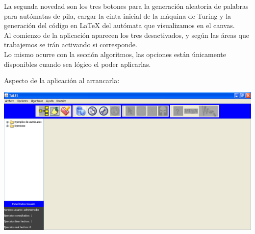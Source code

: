 \documentclass[12pt,a4paper,spanish]{book}
\begin{document}
La segunda novedad son los tres botones para la generaci\'on aleatoria de palabras para aut\'omatas de pila, cargar la cinta inicial de la m\'aquina de Turing y la generaci\'on del c\'odigo en \LaTeX{} del aut\'omata que visualizamos en el canvas.\\
\newline
Al comienzo de la aplicaci\'on aparecen los tres desactivados, y seg\'un las \'areas que trabajemos se ir\'an activando si corresponde.\\ Lo mismo ocurre con la secci\'on algoritmos, las opciones est\'an \'unicamente disponibles cuando sea l\'ogico el poder aplicarlas.\newline

Aspecto de la aplicaci\'on al arrancarla:\\
\begin{center}
\includegraphics[width=\textwidth]{inicial.jpg}
\end{center}

\newpage
\end{document}
